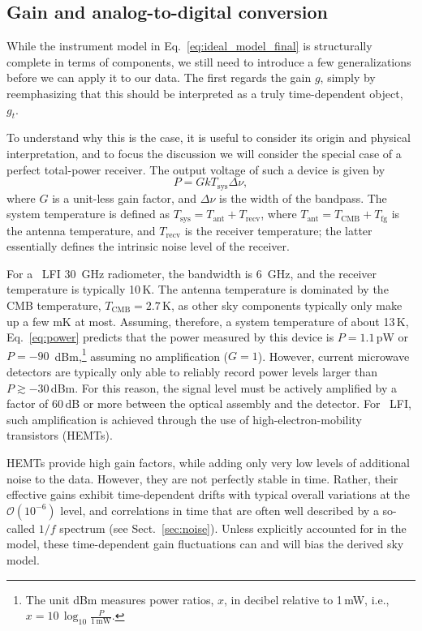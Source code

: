 \documentclass[onecolumn]{aa}
\begin{document}
\subsection{Gain and analog-to-digital conversion}
\label{sec:gain}

While the instrument model in Eq.~\eqref{eq:ideal_model_final} is
structurally complete in terms of components, we still need to
introduce a few generalizations before we can apply it to our
data. The first regards the gain $g$, simply by reemphasizing that
this should be interpreted as a truly time-dependent object, $g_t$.

To understand why this is the case, it is useful to consider its
origin and physical interpretation, and to focus the discussion we
will consider the special case of a perfect total-power receiver. The
output voltage of such a device is given by
\begin{equation}
  P = GkT_{\mathrm{sys}}\Delta\nu,
  \label{eq:power}
\end{equation}
where $G$ is a unit-less gain factor, and $\Delta\nu$ is the width of
the bandpass. The system temperature is defined as
$T_{\mathrm{sys}}=T_{\mathrm{ant}}+T_{\mathrm{recv}}$, where
$T_{\mathrm{ant}}=T_{\mathrm{CMB}} + T_{\mathrm{fg}}$ is the antenna temperature,
and $T_{\mathrm{recv}}$ is the receiver temperature; the latter
essentially defines the intrinsic noise level of the receiver.

For a \Planck\ LFI 30~GHz radiometer, the bandwidth is 6~GHz, and
the receiver temperature is typically 10\,K. The antenna temperature
is dominated by the CMB temperature, $T_{\mathrm{CMB}}=2.7$\,K, as other sky
components typically only make up a few mK at
most. Assuming, therefore, a system temperature of about 13\,K,
Eq.~\eqref{eq:power} predicts that the power measured by this device is
$P=1.1\,$pW or $P=-90$~dBm,\footnote{The unit dBm measures power
  ratios, $x$, in decibel relative to 1\,mW, i.e., $x = 10\,\log_{10}
  \frac{P}{1\,\mathrm{mW}}$.} assuming no amplification
($G=1$). However, current microwave detectors are typically only able
to reliably record power levels larger than $P\gtrsim-30\,$dBm. For
this reason, the signal level must be actively amplified by a factor
of 60\,dB or more between the optical assembly and the detector. For
\Planck\ LFI, such amplification is achieved through the use of
high-electron-mobility transistors (HEMTs).

HEMTs provide high gain factors, while adding only very low levels of
additional noise to the data. However, they are not perfectly stable
in time. Rather, their effective gains exhibit time-dependent drifts
with typical overall variations at the $\mathcal{O}(10^{-6})$ level,
and correlations in time that are often well described by a so-called
$1/f$ spectrum (see Sect.~\ref{sec:noise}). Unless explicitly
accounted for in the model, these time-dependent gain fluctuations can
and will bias the derived sky model.
\end{document}
